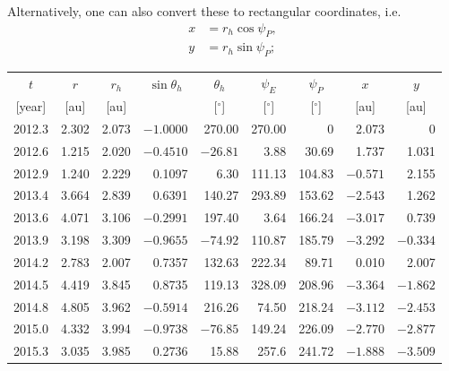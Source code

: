 \begin{description}
  Alternatively, one can also convert these to rectangular coordinates, i.e.
  \begin{align*}
    x &= r_h\cos\psi_P, \\
    y &= r_h\sin\psi_P;
  \end{align*}

  \begin{center}
  \begin{tabular}{rrrrrrrrr}
    \multicolumn{1}{c}{$t$} & \multicolumn{1}{c}{$r$} &
    \multicolumn{1}{c}{$r_h$} & \multicolumn{1}{c}{$\sin\theta_h$} &
    \multicolumn{1}{c}{$\theta_h$} & \multicolumn{1}{c}{$\psi_E$} &
    \multicolumn{1}{c}{$\psi_P$} & \multicolumn{1}{c}{$x$} &
    \multicolumn{1}{c}{$y$} \\
    \multicolumn{1}{c}{[year]} & \multicolumn{1}{c}{[au]} &
    \multicolumn{1}{c}{[au]} & &
    \multicolumn{1}{c}{[$^\circ$]} & \multicolumn{1}{c}{[$^\circ$]} &
    \multicolumn{1}{c}{[$^\circ$]} & \multicolumn{1}{c}{[au]} &
    \multicolumn{1}{c}{[au]} \\
    \hline
    2012.3 & 2.302 & 2.073 & $-1.0000$ & 270.00 & 270.00 & 0 & 2.073 & 0 \\
    2012.6 & 1.215 & 2.020 & $-0.4510$ & $-26.81$ & 3.88 & 30.69 & 1.737 & 1.031 \\
    2012.9 & 1.240 & 2.229 & 0.1097 & 6.30 & 111.13 & 104.83 & $-0.571$ & 2.155 \\
    2013.4 & 3.664 & 2.839 & 0.6391 & 140.27 & 293.89 & 153.62 & $-2.543$ & 1.262 \\
    2013.6 & 4.071 & 3.106 & $-0.2991$ & 197.40 & 3.64 & 166.24 & $-3.017$ & 0.739 \\
    2013.9 & 3.198 & 3.309 & $-0.9655$ & $-74.92$ & 110.87 & 185.79 & $-3.292$ & $-0.334$ \\
    2014.2 & 2.783 & 2.007 & 0.7357 & 132.63 & 222.34 & 89.71 & 0.010 & 2.007 \\
    2014.5 & 4.419 & 3.845 & 0.8735 & 119.13 & 328.09 & 208.96 & $-3.364$ & $-1.862$ \\
    2014.8 & 4.805 & 3.962 & $-0.5914$ & 216.26 & 74.50 & 218.24 & $-3.112$ & $-2.453$ \\
    2015.0 & 4.332 & 3.994 & $-0.9738$ & $-76.85$ & 149.24 & 226.09 & $-2.770$ & $-2.877$ \\
    2015.3 & 3.035 & 3.985 & 0.2736 & 15.88 & 257.6 & 241.72 & $-1.888$ & $-3.509$ \\
    \hline
  \end{tabular}
  \end{center}


\end{description}
